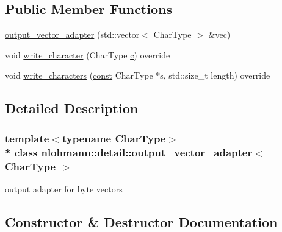 \subsection*{Public Member Functions}
\begin{DoxyCompactItemize}
\item 
\hyperlink{classnlohmann_1_1detail_1_1output__vector__adapter_abc6695e8c0274afad31bd581c8acf24f}{output\+\_\+vector\+\_\+adapter} (std\+::vector$<$ Char\+Type $>$ \&vec)
\item 
void \hyperlink{classnlohmann_1_1detail_1_1output__vector__adapter_af6a22d4210bb7bc2da66021300ddd6db}{write\+\_\+character} (Char\+Type \hyperlink{functions__f_8js_aadfd49790b56c82605242ff3896447ed}{c}) override
\item 
void \hyperlink{classnlohmann_1_1detail_1_1output__vector__adapter_ad6f6c461dec7bedd5359454dc22fc9aa}{write\+\_\+characters} (\hyperlink{functions__c_8js_afacfd9c985d225bb07483b887a801b6f}{const} Char\+Type $\ast$s, std\+::size\+\_\+t length) override
\end{DoxyCompactItemize}


\subsection{Detailed Description}
\subsubsection*{template$<$typename Char\+Type$>$\\*
class nlohmann\+::detail\+::output\+\_\+vector\+\_\+adapter$<$ Char\+Type $>$}

output adapter for byte vectors 

\subsection{Constructor \& Destructor Documentation}
